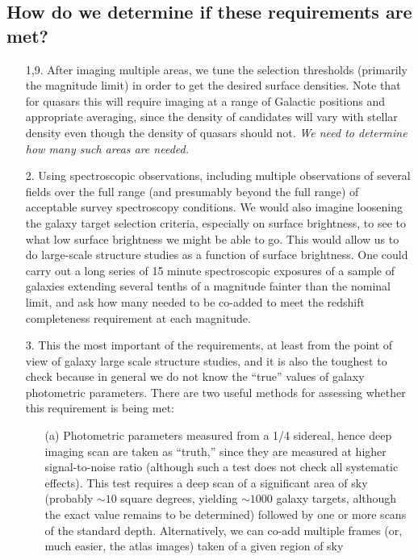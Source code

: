 \subsection{How do we determine if these requirements are met?}

\begin{enumerate}
\item[1,9.] After imaging multiple areas, we tune the selection thresholds
(primarily the magnitude limit) in order to get the desired surface densities.
Note that for quasars this will require imaging at a range of Galactic
positions and appropriate averaging, since the density of candidates
will vary with stellar density even though the density of quasars
should not. {\it We need to determine how many such areas are needed.}
\item[2.] Using spectroscopic observations, including multiple observations
of several fields over the full range (and presumably beyond the full range)
of acceptable survey spectroscopy conditions.  We would also imagine
loosening the galaxy target selection criteria, especially on surface
brightness, to see to what low surface brightness we might be able to
go.  This would allow us to do large-scale structure studies as a
function of surface brightness.  One could carry out a long series of
15 minute spectroscopic exposures of a sample of galaxies extending
several tenths of a magnitude fainter than the nominal limit, and ask how many needed
to be co-added to meet the redshift completeness requirement at each
magnitude. 
\item[3.] This the most important of the requirements, at least from the point
of view of galaxy large scale structure studies, and it is also the toughest
to check because in general we do not know the ``true'' values of galaxy
photometric parameters.  There are two useful methods for assessing
whether this requirement is being met:
\begin{enumerate}
\item[(a)] Photometric parameters measured from a 1/4 sidereal, hence deep
imaging scan are taken as ``truth,'' since they are measured at higher
signal-to-noise ratio (although such a test does not check all
systematic effects).   This test requires a deep scan of a significant
area of sky (probably $\sim 10$ square degrees, yielding $\sim 1000$ galaxy
targets, although the exact value remains to be determined) followed
by one or more scans of the standard depth.   
Alternatively, we can co-add multiple frames (or, much easier, the
atlas images) taken of a given region of sky 

\end{enumerate}
\end{enumerate}
